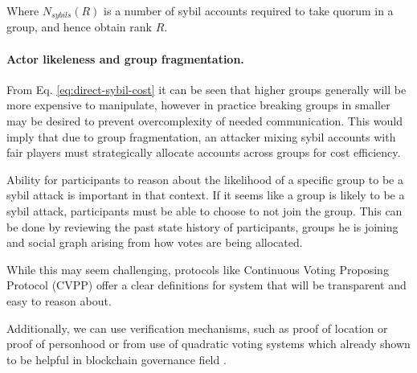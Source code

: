 \documentclass{article}
\begin{document}
\begin{CJK}{UTF8}{gbsn}
    Where $N_{sybils}(R)$ is a number of sybil accounts required to take quorum in a group, and hence obtain rank $R$.

    \paragraph{Actor likeleness and group fragmentation.}
    From Eq. \ref{eq:direct-sybil-cost} it can be seen that higher groups generally will be more expensive to manipulate, however in practice breaking groups in smaller may be desired to prevent overcomplexity of needed communication. This would imply that due to group fragmentation, an attacker mixing sybil accounts with fair players must strategically allocate accounts across groups for cost efficiency.

    Ability for participants to reason about the likelihood of a specific group to be a sybil attack is important in that context. If it seems like a group is likely to be a sybil attack, participants must be able to choose to not join the group. This can be done by reviewing the past state history of participants, groups he is joining and social graph arising from how votes are being allocated.

    While this may seem challenging, protocols like Continuous Voting Proposing Protocol (CVPP) \cite{cvpp} offer a clear definitions for system that will be transparent and easy to reason about.

    Additionally, we can use verification mechanisms, such as proof of location \cite{sheng2024bftpolocbyzantinefortifiedtrigonometric} or proof of personhood \cite{WorldCoin2024} or from use of quadratic voting systems which already shown to be helpful in blockchain governance field \cite{Buterin20}\cite{Benhaim2024}.


\end{CJK}
\end{document}
